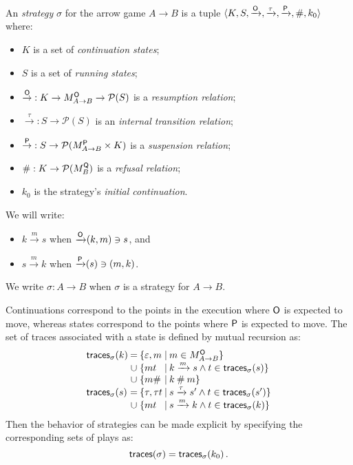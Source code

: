 \begin{definition} %
\label{def:strat}
An \emph{strategy} $\sigma$ for the arrow game $A \rightarrow B$
is a tuple
$\langle K, S,
{\xrightarrow{ \mathsf{O} } },
{\xrightarrow{\tau}},
{\xrightarrow{ \mathsf{P} } },
 \#, k_0 \rangle$
where:
\begin{itemize}
  \item $K$ is a set of \emph{continuation states};
  \item $S$ is a set of \emph{running states};
  \item ${\stackrel{ \mathsf{O} }{\rightarrow}} :
         K \rightarrow M_{A \rightarrow B}^{ \mathsf{O} } \rightarrow \mathcal{P}(S)$
    is a \emph{resumption relation};
  \item ${\stackrel{\tau}{\rightarrow}} : S \rightarrow \mathcal{P}(S)$
    is an \emph{internal transition relation};
  \item ${\stackrel{ \mathsf{P} }{\rightarrow}} :
         S \rightarrow \mathcal{P}(M_{A \rightarrow B}^{ \mathsf{P} } \times K)$
    is a \emph{suspension relation};
  \item ${\#} : K \rightarrow \mathcal{P}(M_B^{ \mathsf{Q} })$
    is a \emph{refusal relation};
  \item $k_0$
    is the strategy's \emph{initial continuation}.
\end{itemize}
We will write:
\begin{itemize}
  \item $k \xrightarrow{m} s$ when ${\xrightarrow{ \mathsf{O} } }(k, m) \ni s$, and
  \item $s \xrightarrow{m} k$ when ${\xrightarrow{ \mathsf{P} } }(s) \ni (m, k)$.
\end{itemize}
We write $\sigma : A \rightarrow B$ when $\sigma$ is a strategy
for $A \rightarrow B$.
\end{definition}

Continuations correspond to
the points in the execution where $ \mathsf{O} $ is expected to move,
whereas states correspond to
the points where $ \mathsf{P} $ is expected to move.
The set of traces associated with a state is
defined by mutual recursion as:
\[
  \begin{array}{l@{\:}c@{\:\{}l@{\:\mid\:}l}
    \kw{traces}_\sigma(k) & = & \varepsilon, m &
      m \in M_{A \rightarrow B}^\kw{O} \} \\
    & \cup & m t &
      k \xrightarrow{m} s \wedge t \in \kw{traces}_\sigma(s) \} \\
    & \cup & m \# &
      k \: \# \: m \} \\
    \kw{traces}_\sigma(s) & = & \tau, \tau t &
      s \xrightarrow{\tau} s' \wedge t \in \kw{traces}_\sigma(s') \} \\
    & \cup & m t &
      s \xrightarrow{m} k \wedge t \in \kw{traces}_\sigma(k) \}
  \end{array}
\]
Then the behavior of strategies can be made explicit
by specifying the corresponding sets of plays as:
\[
   \mathsf{traces} (\sigma) =  \mathsf{traces} _\sigma(k_0) \,.
\]

